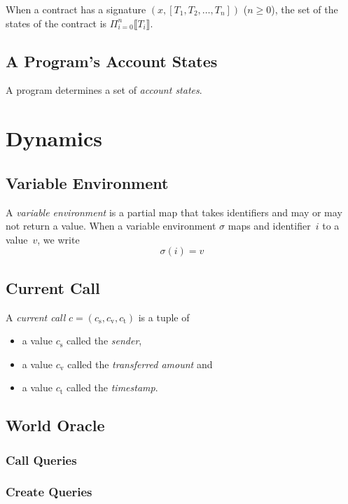 \documentclass{book}
\newcommand{\sem}[1]{\llbracket{#1}\rrbracket}
\begin{document}
When a contract has a signature $(x, [T_1, T_2, \ldots, T_n])$ ($n \ge 0$),
the set of the states of the contract is
$\Pi_{i = 0}^{n} \sem{T_i}$.

\subsection{A Program's Account States}
A program determines a set of \textit{account states}.

\section{Dynamics}

\subsection{Variable Environment}

A \textit{variable environment} is a partial map that takes identifiers and may or may not return a value.  When a variable environment $\sigma$ maps and identifier~$i$ to a value~$v$, we write
\[
\sigma(i) = v
\]

\subsection{Current Call}

A \textit{current call} $c = (c_\mathrm{s}, c_\mathrm{v}, c_\mathrm{t})$ is a tuple of
\begin{itemize}
\item a value $c_\mathrm{s}$ called the \textit{sender},
\item a value $c_\mathrm{v}$ called the \textit{transferred amount} and
\item a value $c_\mathrm{t}$ called the \textit{timestamp}.
\end{itemize}

\subsection{World Oracle}

\subsubsection{Call Queries}

\subsubsection{Create Queries}
\end{document}

